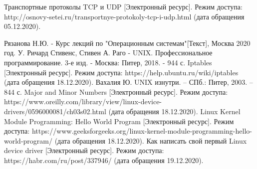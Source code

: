 \newpage
{}

\begin{thebibliography}{}
     Транспортные протоколы TCP и UDP [Электронный ресурс]. Режим доступа: http://osnovy-setei.ru/transportnye-protokoly-tcp-i-udp.html (дата обращения 05.12.2020).
    
    Рязанова Н.Ю.  -  Курс лекций по "Операционным системам"[Текст], Москва 2020 год.
      У. Ричард Стивенс, Стивен А. Раго - UNIX. Профессиональное программирование. 3-е изд. - Москва: Питер, 2018. - 944 с.
     Iptables [Электронный ресурс]. Режим доступа: https://help.ubuntu.ru/wiki/iptables (дата обращения 18.12.2020).
    Вахалия Ю. UNIX изнутри. – СПб.: Питер, 2003. – 844 с.
    Major and Minor Numbers [Электронный ресурс]. Режим доступа: https://www.oreilly.com/library/view/linux-device-drivers/0596000081/ch03s02.html (дата обращения 18.12.2020).
    Linux Kernel Module Programming: Hello World Program [Электронный ресурс]. Режим доступа: https://www.geeksforgeeks.org/linux-kernel-module-programming-hello-world-program/ (дата обращения 18.12.2020).
    Как написать свой первый Linux device driver [Электронный ресурс]. Режим доступа: https://habr.com/ru/post/337946/ (дата обращения 19.12.2020).
\end{thebibliography}
